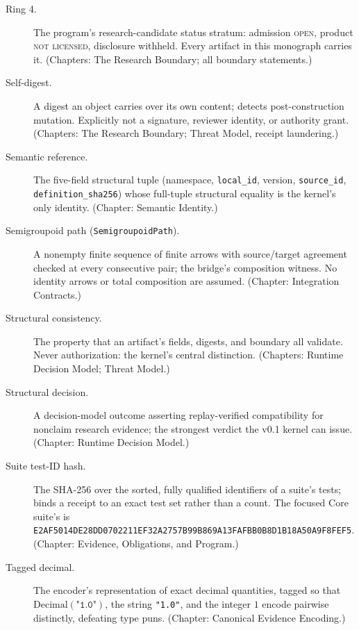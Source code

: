 \begin{description}
\item[Ring 4.] The program's research-candidate status stratum: admission \textsc{open}, product \textsc{not licensed}, disclosure withheld. Every artifact in this monograph carries it. (Chapters: The Research Boundary; all boundary statements.)

\item[Self-digest.] A digest an object carries over its own content; detects post-construction mutation. Explicitly not a signature, reviewer identity, or authority grant. (Chapters: The Research Boundary; Threat Model, receipt laundering.)

\item[Semantic reference.] The five-field structural tuple (namespace, \texttt{local\_id}, version, \texttt{source\_id}, \texttt{definition\_sha256}) whose full-tuple structural equality is the kernel's only identity. (Chapter: Semantic Identity.)

\item[Semigroupoid path (\texttt{SemigroupoidPath}).] A nonempty finite sequence of finite arrows with source/target agreement checked at every consecutive pair; the bridge's composition witness. No identity arrows or total composition are assumed. (Chapter: Integration Contracts.)

\item[Structural consistency.] The property that an artifact's fields, digests, and boundary all validate. Never authorization: the kernel's central distinction. (Chapters: Runtime Decision Model; Threat Model.)

\item[Structural decision.] A decision-model outcome asserting replay-verified compatibility for nonclaim research evidence; the strongest verdict the v0.1 kernel can issue. (Chapter: Runtime Decision Model.)

\item[Suite test-ID hash.] The SHA-256 over the sorted, fully qualified identifiers of a suite's tests; binds a receipt to an exact test set rather than a count. The focused Core suite's is \texttt{E2AF5014DE28DD0702211EF32A2757B99B869A13FAFBB0B8D1B18A50A9F8FEF5}. (Chapter: Evidence, Obligations, and Program.)

\item[Tagged decimal.] The encoder's representation of exact decimal quantities, tagged so that $\mathrm{Decimal}(\texttt{"1.0"})$, the string \texttt{"1.0"}, and the integer $1$ encode pairwise distinctly, defeating type puns. (Chapter: Canonical Evidence Encoding.)


\end{description}
